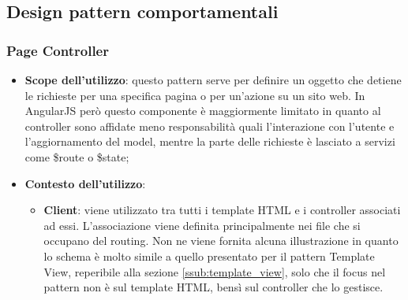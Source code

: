 %


\subsection{Design pattern comportamentali} %
\label{sub:design_pattern_comportamentali}

	\subsubsection{Page Controller} %
	\label{ssub:page_controller}
	\begin{itemize}
		\item \textbf{Scope dell'utilizzo}: questo pattern serve per definire un oggetto che detiene le richieste per una specifica pagina o per un'azione su un sito web. In AngularJS però questo componente è maggiormente limitato in quanto al controller sono affidate meno responsabilità quali l'interazione con l'utente e l'aggiornamento del model, mentre la parte delle richieste è lasciato a servizi come \$route o \$state;
		\item \textbf{Contesto dell'utilizzo}:
			\begin{itemize}
				\item \textbf{Client}: viene utilizzato tra tutti i template HTML e i controller associati ad essi. L'associazione viene definita principalmente nei file che si occupano del routing. \newline
				Non ne viene fornita alcuna illustrazione in quanto lo schema è molto simile a quello presentato per il pattern Template View, reperibile alla sezione \ref{ssub:template_view}, solo che il focus nel pattern non è sul template HTML, bensì sul controller che lo gestisce.
			\end{itemize}
	\end{itemize}


